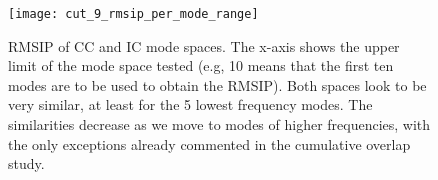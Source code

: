 \begin{figure}
\texttt{[image: cut\_9\_rmsip\_per\_mode\_range]}
\caption{RMSIP of CC and IC mode spaces. The x-axis shows the upper limit of the mode space tested (e.g, 10 means that the first ten modes are to be used to obtain the RMSIP). Both spaces look to be very similar, at least for the 5 lowest frequency modes. The similarities decrease as we move to modes of higher frequencies, with the only exceptions already commented in the cumulative overlap study.}
\label{fig:cut_9_rmsip_per_mode_range}
\end{figure}
